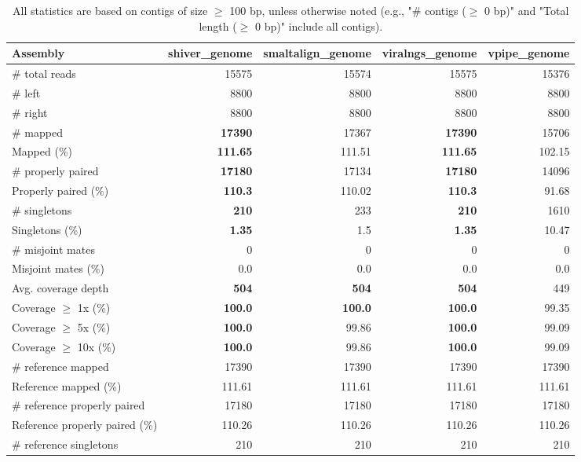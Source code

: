 \documentclass[12pt,a4paper]{article}
\begin{document}
\begin{table}[ht]
\begin{center}
\caption{All statistics are based on contigs of size $\geq$ 100 bp, unless otherwise noted (e.g., "\# contigs ($\geq$ 0 bp)" and "Total length ($\geq$ 0 bp)" include all contigs).}
\begin{tabular}{|l*{4}{|r}|}
\hline
Assembly & shiver\_genome & smaltalign\_genome & viralngs\_genome & vpipe\_genome \\ \hline
\# total reads & 15575 & 15574 & 15575 & 15376 \\ \hline
\# left & 8800 & 8800 & 8800 & 8800 \\ \hline
\# right & 8800 & 8800 & 8800 & 8800 \\ \hline
\# mapped & {\bf 17390} & 17367 & {\bf 17390} & 15706 \\ \hline
Mapped (\%) & {\bf 111.65} & 111.51 & {\bf 111.65} & 102.15 \\ \hline
\# properly paired & {\bf 17180} & 17134 & {\bf 17180} & 14096 \\ \hline
Properly paired (\%) & {\bf 110.3} & 110.02 & {\bf 110.3} & 91.68 \\ \hline
\# singletons & {\bf 210} & 233 & {\bf 210} & 1610 \\ \hline
Singletons (\%) & {\bf 1.35} & 1.5 & {\bf 1.35} & 10.47 \\ \hline
\# misjoint mates & 0 & 0 & 0 & 0 \\ \hline
Misjoint mates (\%) & 0.0 & 0.0 & 0.0 & 0.0 \\ \hline
Avg. coverage depth & {\bf 504} & {\bf 504} & {\bf 504} & 449 \\ \hline
Coverage $\geq$ 1x (\%) & {\bf 100.0} & {\bf 100.0} & {\bf 100.0} & 99.35 \\ \hline
Coverage $\geq$ 5x (\%) & {\bf 100.0} & 99.86 & {\bf 100.0} & 99.09 \\ \hline
Coverage $\geq$ 10x (\%) & {\bf 100.0} & 99.86 & {\bf 100.0} & 99.09 \\ \hline
\# reference mapped & 17390 & 17390 & 17390 & 17390 \\ \hline
Reference mapped (\%) & 111.61 & 111.61 & 111.61 & 111.61 \\ \hline
\# reference properly paired & 17180 & 17180 & 17180 & 17180 \\ \hline
Reference properly paired (\%) & 110.26 & 110.26 & 110.26 & 110.26 \\ \hline
\# reference singletons & 210 & 210 & 210 & 210 \\ \hline

\end{tabular}
\end{center}
\end{table}
\end{document}
